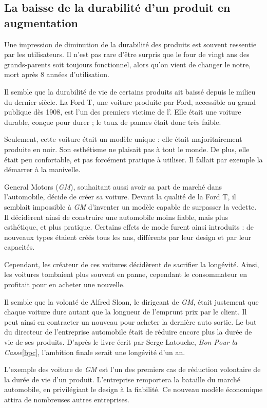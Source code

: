 \subsection{La baisse de la durabilité d'un produit en augmentation}

Une impression de diminution de la durabilité des produits est souvent ressentie par les utilisateurs.  Il n'est pas rare d'être surpris que le four de vingt ans des grands-parents soit toujours fonctionnel, alors qu'on vient de changer le notre, mort après 8 années d'utilisation. 

Il semble que la durabilité de vie de certains produits ait baissé depuis le milieu du dernier siècle. 
\smallbreak
La Ford T, une voiture produite par Ford, accessible au grand publique dès 1908, est l'un des premiers victime de l'\op. Elle était une voiture durable, conçue pour durer ; le taux de pannes était donc très faible.   

Seulement, cette voiture était un modèle unique : elle était majoritairement produite en noir. Son esthétisme ne plaisait pas à tout le monde. De plus, elle était peu confortable, et pas forcément pratique à utiliser. Il fallait par exemple la démarrer à la manivelle. 

General Motors (\textit{GM}), souhaitant aussi avoir sa part de marché dans l'automobile, décide de créer sa voiture. Devant la qualité de la Ford T, il semblait impossible à \textit{GM} d'inventer un modèle capable de surpasser la vedette. Il décidèrent ainsi de construire une automobile moins fiable, mais plus esthétique, et plus pratique. Certains effets de mode furent ainsi introduits : de nouveaux types étaient créés tous les ans, différents par leur design et par leur capacités.

Cependant, les créateur de ces voitures décidèrent de sacrifier la longévité. Ainsi, les voitures tombaient plus souvent en panne, cependant le consommateur en profitait pour en acheter une nouvelle. 

Il semble que la volonté de Alfred Sloan, le dirigeant de \textit{GM}, était justement que chaque voiture dure autant que la longueur de l'emprunt prix par le client. Il peut ainsi en contracter un nouveau pour acheter la dernière auto sortie. Le but du directeur de l'entreprise automobile était de réduire encore plus la durée de vie de ses produits. D'après le livre écrit par Serge Latouche, \textit{Bon Pour la Casse}\ref{bpc}, l'ambition finale serait une longévité d'un an. 

\smallbreak
L'exemple des voiture de \textit{GM} est l'un des premiers cas de réduction volontaire de la durée de vie d'un produit. L'entreprise remportera la bataille du marché automobile, en privilégiant le design à la fiabilité. Ce nouveau modèle économique attira de nombreuses autres entreprises. 

